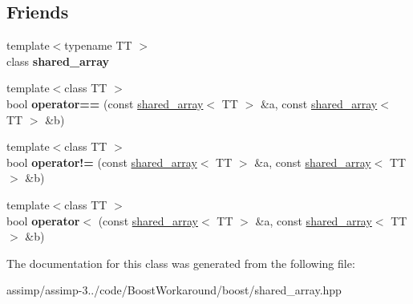 \subsection*{Friends}
\begin{DoxyCompactItemize}
\item 
\hypertarget{classboost_1_1shared__array_a28495f96a23e1bdd116a51d4360fad7f}{{\footnotesize template$<$typename T\+T $>$ }\\class {\bfseries shared\+\_\+array}}\label{classboost_1_1shared__array_a28495f96a23e1bdd116a51d4360fad7f}

\item 
\hypertarget{classboost_1_1shared__array_a3c39fa34e2710c7ffb9863a2bb3d7aad}{{\footnotesize template$<$class T\+T $>$ }\\bool {\bfseries operator==} (const \hyperlink{classboost_1_1shared__array}{shared\+\_\+array}$<$ T\+T $>$ \&a, const \hyperlink{classboost_1_1shared__array}{shared\+\_\+array}$<$ T\+T $>$ \&b)}\label{classboost_1_1shared__array_a3c39fa34e2710c7ffb9863a2bb3d7aad}

\item 
\hypertarget{classboost_1_1shared__array_a8f9cebb5203053572489314d73752475}{{\footnotesize template$<$class T\+T $>$ }\\bool {\bfseries operator!=} (const \hyperlink{classboost_1_1shared__array}{shared\+\_\+array}$<$ T\+T $>$ \&a, const \hyperlink{classboost_1_1shared__array}{shared\+\_\+array}$<$ T\+T $>$ \&b)}\label{classboost_1_1shared__array_a8f9cebb5203053572489314d73752475}

\item 
\hypertarget{classboost_1_1shared__array_a0a508d3c55e82c3194a7993d98204691}{{\footnotesize template$<$class T\+T $>$ }\\bool {\bfseries operator$<$} (const \hyperlink{classboost_1_1shared__array}{shared\+\_\+array}$<$ T\+T $>$ \&a, const \hyperlink{classboost_1_1shared__array}{shared\+\_\+array}$<$ T\+T $>$ \&b)}\label{classboost_1_1shared__array_a0a508d3c55e82c3194a7993d98204691}

\end{DoxyCompactItemize}


The documentation for this class was generated from the following file\+:\begin{DoxyCompactItemize}
\item 
assimp/assimp-\/3../code/\+Boost\+Workaround/boost/shared\+\_\+array.\+hpp\end{DoxyCompactItemize}
